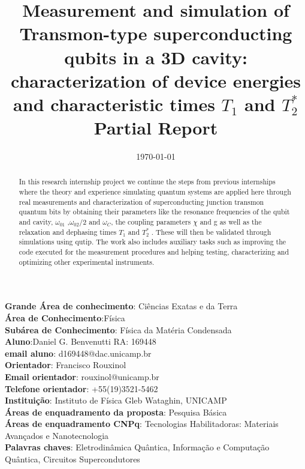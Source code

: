 \documentclass[11pt,onecolumm,a4paper]{article}
\title{ \LARGE Measurement and simulation of Transmon-type superconducting qubits in a 3D cavity: characterization of device energies and characteristic times $T_1$ and $T_2^*$ \\
\normalsize Partial Report}
\date{\today}
\date{}
\begin{document}
\maketitle
\noindent
\textbf{Grande Área de conhecimento}: Ciências Exatas e da Terra\\
\textbf{Área de Conhecimento}:Física\\
\textbf{Subárea de Conhecimento}: Física da Matéria Condensada\\
\textbf{Aluno}:Daniel G. Benvenutti RA: 169448\\
\textbf{email aluno}: d169448@dac.unicamp.br\\
\textbf{Orientador}: Francisco Rouxinol\\
\textbf{Email orientador}: rouxinol@unicamp.br\\
\textbf{Telefone orientador}: +55(19)3521-5462\\
\textbf{Instituição}: Instituto de Física Gleb Wataghin, UNICAMP\\
\textbf{Áreas de enquadramento da proposta}: Pesquisa Básica\\
\textbf{Áreas de enquadramento CNPq}: Tecnologias Habilitadoras: Materiais Avançados e Nanotecnologia\\
\textbf{Palavras chaves}: Eletrodinâmica Quântica, Informação e Computação Quântica, Circuitos Supercondutores\\

\begin{abstract}
In this research internship project we continue the steps from previous internships where the theory and experience simulating quantum systems are applied here through real measurements and characterization of superconducting junction transmon quantum bits by obtaining their  parameters like the resonance frequencies of the qubit and cavity, $\omega_{01}$ ,$\omega_{02}/2$  and  $\omega_C$, the coupling parameters $\chi$ and g as well as the relaxation and dephasing times $T_1$ and $T_2^*$ . These will then be validated through simulations using qutip. The work also includes auxiliary tasks such as improving the code executed for the measurement procedures and helping testing, characterizing and optimizing other experimental instruments.

\end{abstract}
\end{document}
